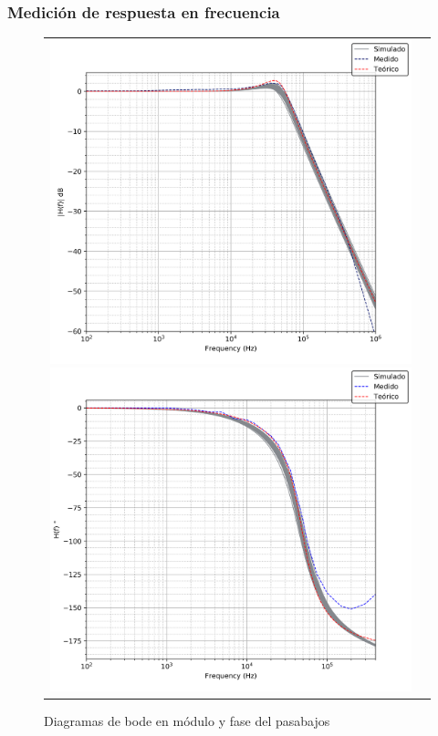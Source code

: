 \subsubsection{Medici\'on de respuesta en frecuencia}

\begin{figure}[H]
    \centering
    \begin{tabular}{c c}
        \includegraphics[scale=0.4]{Recursos/pasabajos_plottool_modulo.png}
        \includegraphics[scale=0.4]{Recursos/pasabajos_plottool_fase.png}
    \end{tabular}
    \caption{Diagramas de bode en m\'odulo y fase del pasabajos}
    \label{fig:respuesta_frecuencia_pasabajos}
\end{figure}


